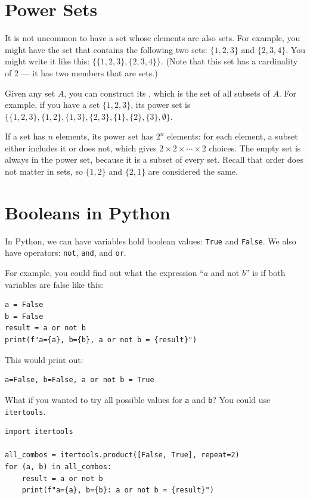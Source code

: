 \section{Power Sets}

It is not uncommon to have a set whose elements are also sets.  For
example, you might have the set that contains the following two sets:
$\{1,2,3\}$ and $\{2,3,4\}$. You might write it like this: $\{
\{1,2,3\}, \{2,3,4\} \}$. (Note that this set has a cardinality of 2
--- it has two members that are sets.)

Given any set $A$, you can construct its , which is
the set of all subsets of $A$.  For example, if you have a set
$\{1,2,3\}$, its power set is $\{\{1,2,3\}, \{1,2\},\{1,3\}, \{2,3\},
\{1\}, \{2\}, \{3\}, \emptyset\}$.

If a set has $n$ elements, its power set has $2^n$ elements: for each element, a subset either includes it or does not, which gives $2 \times 2 \times \cdots \times 2$ choices. The empty set is always in the power set, because it is a subset of every set. Recall that order does not matter in sets, so $\{1,2\}$ and $\{2,1\}$ are considered the same.

\section{Booleans in Python}

In Python, we can have variables hold boolean values: \texttt{True}
and \texttt{False}.  We also have operators: \texttt{not},
\texttt{and}, and \texttt{or}.

For example, you could find out what the expression ``$a$ and not
$b$'' is if both variables are false like this:
\begin{verbatim}
a = False
b = False
result = a or not b
print(f"a={a}, b={b}, a or not b = {result}")
\end{verbatim}

This would print out:
\begin{verbatim}
a=False, b=False, a or not b = True
\end{verbatim}

What if you wanted to try all possible values for \texttt{a} and
\texttt{b}? You could use \texttt{itertools}.

\begin{verbatim}
import itertools

all_combos = itertools.product([False, True], repeat=2)
for (a, b) in all_combos:
    result = a or not b
    print(f"a={a}, b={b}: a or not b = {result}")       
\end{verbatim}

